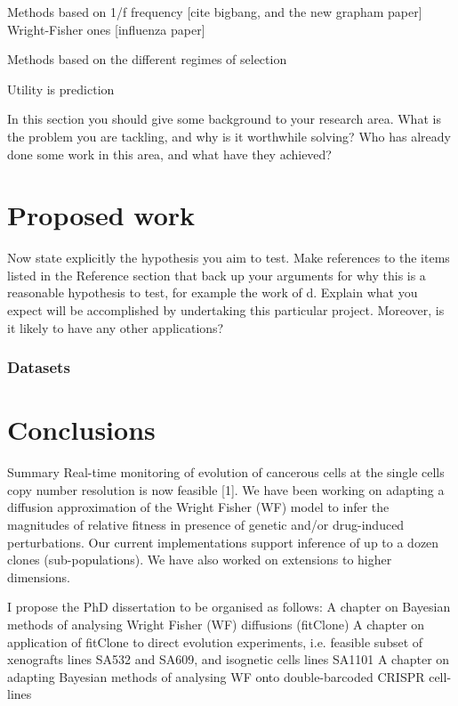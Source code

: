 \documentclass[12pt, a4paper]{article}
\begin{document}
Methods based on 1/f frequency [cite bigbang, and the new grapham paper]
Wright-Fisher ones [influenza paper]

Methods based on the different regimes of selection

Utility is prediction

In this section you should give some background to your
research area. What is the problem you are tackling, and why is it
worthwhile solving? Who has already done some work in this area,
and what have they achieved?

\section*{Proposed work} Now state explicitly the hypothesis you aim to
test. Make references to the items listed in the Reference section
that back up your arguments for why this is a reasonable
hypothesis to test, for example the work of d.
Explain what you expect will be accomplished by undertaking this
particular project.  Moreover, is it likely to have any other
applications?
 
 \subsubsection{Datasets}
 
 
 
\section*{Conclusions} 
Summary
Real-time monitoring of evolution of cancerous cells at the single cells copy number resolution is now feasible [1]. We have been working on adapting a diffusion approximation of the Wright Fisher (WF) model to infer the magnitudes of relative fitness in presence of genetic and/or drug-induced perturbations. Our current implementations support inference of up to a dozen clones (sub-populations). We have also worked on extensions to higher dimensions.

I propose the PhD dissertation to be organised as follows:
A chapter on Bayesian methods of analysing Wright Fisher (WF) diffusions (fitClone)
A chapter on application of fitClone to direct evolution experiments, i.e. feasible subset of xenografts lines SA532 and SA609, and isognetic cells lines SA1101
A chapter on adapting Bayesian methods of analysing WF onto double-barcoded CRISPR cell-lines
\end{document}
